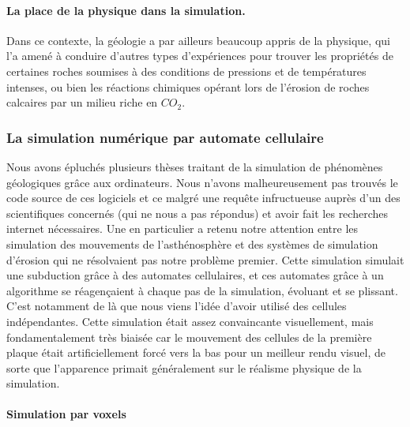 \documentclass[a4paper,11pt]{article}
\begin{document}
\paragraph{La place de la physique dans la simulation.}

Dans ce contexte, la géologie a par ailleurs beaucoup appris de la physique, qui l'a amené à conduire d'autres types d'expériences pour trouver les propriétés de certaines roches soumises à des conditions de pressions et de températures intenses, ou bien les réactions chimiques opérant lors de l'érosion de roches calcaires par un milieu riche en $CO_2$.

\subsubsection{La simulation numérique par automate cellulaire}

Nous avons épluchés plusieurs thèses traitant de la simulation de phénomènes géologiques grâce aux ordinateurs.
Nous n'avons malheureusement pas trouvés le code source de ces logiciels et ce malgré une requête infructueuse auprès d'un des scientifiques concernés (qui ne nous a pas répondus) et avoir fait les recherches internet nécessaires.
Une en particulier a retenu notre attention entre les simulation des mouvements de l’asthénosphère et des systèmes de simulation d'érosion qui ne résolvaient pas notre problème premier.
Cette simulation simulait une subduction grâce à des automates cellulaires, et ces automates grâce à un algorithme se réagençaient à chaque pas de la simulation, évoluant et se plissant.
C'est notamment de là que nous viens l'idée d'avoir utilisé des cellules indépendantes.
Cette simulation était assez convaincante visuellement, mais fondamentalement très biaisée car le mouvement des cellules de la première plaque était artificiellement forcé vers la bas pour un meilleur rendu visuel, de sorte que l'apparence primait généralement sur le réalisme physique de la simulation.

\paragraph{Simulation par voxels}
\end{document}
